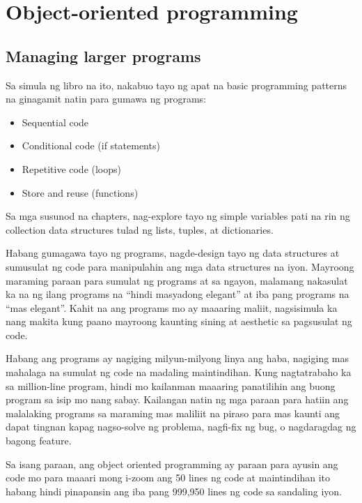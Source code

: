 \documentclass[10pt,]{book}
\providecommand{\tightlist}{%
  \setlength{\itemsep}{0pt}\setlength{\parskip}{0pt}}
\begin{document}
\chapter{Object-oriented programming}\label{object-oriented-programming}

\section{Managing larger programs}\label{managing-larger-programs}


Sa simula ng libro na ito, nakabuo tayo ng apat na basic programming
patterns na ginagamit natin para gumawa ng programs:

\begin{itemize}
\tightlist
\item
  Sequential code
\item
  Conditional code (if statements)
\item
  Repetitive code (loops)
\item
  Store and reuse (functions)
\end{itemize}

Sa mga susunod na chapters, nag-explore tayo ng simple variables pati na
rin ng collection data structures tulad ng lists, tuples, at
dictionaries.

Habang gumagawa tayo ng programs, nagde-design tayo ng data structures
at sumusulat ng code para manipulahin ang mga data structures na iyon.
Mayroong maraming paraan para sumulat ng programs at sa ngayon, malamang
nakasulat ka na ng ilang programs na ``hindi masyadong elegant'' at iba
pang programs na ``mas elegant''. Kahit na ang programs mo ay maaaring
maliit, nagsisimula ka nang makita kung paano mayroong kaunting sining
at aesthetic sa pagsusulat ng code.

Habang ang programs ay nagiging milyun-milyong linya ang haba, nagiging
mas mahalaga na sumulat ng code na madaling maintindihan. Kung
nagtatrabaho ka sa million-line program, hindi mo kailanman maaaring
panatilihin ang buong program sa isip mo nang sabay. Kailangan natin ng
mga paraan para hatiin ang malalaking programs sa maraming mas maliliit
na piraso para mas kaunti ang dapat tingnan kapag nagso-solve ng
problema, nagfi-fix ng bug, o nagdaragdag ng bagong feature.

Sa isang paraan, ang object oriented programming ay paraan para ayusin
ang code mo para maaari mong i-zoom ang 50 lines ng code at maintindihan
ito habang hindi pinapansin ang iba pang 999,950 lines ng code sa
sandaling iyon.
\end{document}

